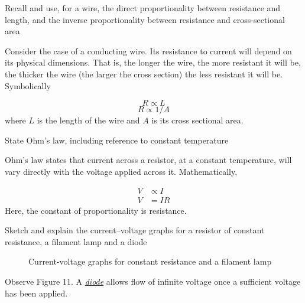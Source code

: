 \begin{subpoint}
Recall and use, for a wire, the direct proportionality between resistance and length, and the inverse 
proportionality between resistance and cross-sectional area
\end{subpoint}

Consider the case of a conducting wire. Its resistance to current will depend on its physical
dimensions. That is, the longer the wire, the more resistant it will be, the thicker the wire
(the larger the cross section) the less resistant it will be. Symbolically

$$ R \propto L $$
$$ R \propto 1/A $$
where $L$ is the length of the wire and $A$ is its cross sectional area.

\begin{subpoint}
State Ohm’s law, including reference to constant temperature
\end{subpoint}

Ohm's law states that current across a resistor, at a constant temperature, will vary directly
with the voltage applied across it. Mathematically,

\begin{align*}
	V &\propto I \\ 
	V &= IR
\end{align*}
Here, the constant of proportionality is resistance.

\begin{subpoint}
Sketch and explain the current–voltage graphs for a resistor of constant resistance, a filament lamp and a 
diode
\end{subpoint}

\begin{figure}
	\centering
	\caption{Current-voltage graphs for constant resistance and a filament lamp}
\end{figure}

Observe Figure 11. A \ul{\emph{diode}} allows flow of infinite voltage once a sufficient voltage has been 
applied. 

